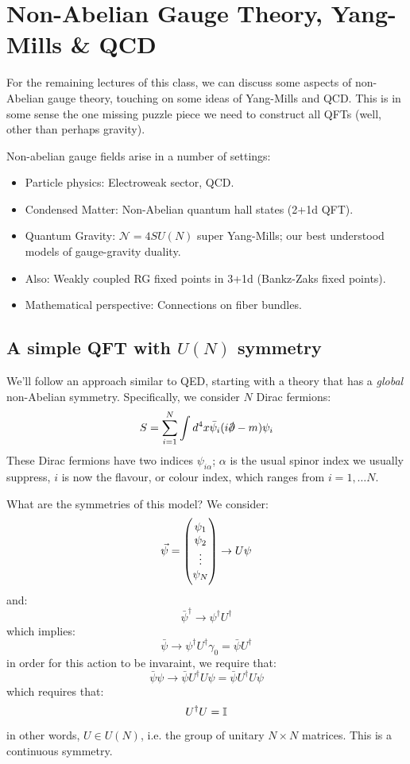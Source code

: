 \section{Non-Abelian Gauge Theory, Yang-Mills \& QCD}
For the remaining lectures of this class, we can discuss some aspects of non-Abelian gauge theory, touching on some ideas of Yang-Mills and QCD. This is in some sense the one missing puzzle piece we need to construct all QFTs (well, other than perhaps gravity).

Non-abelian gauge fields arise in a number of settings:
\begin{itemize}
    \item Particle physics: Electroweak sector, QCD.
    \item Condensed Matter: Non-Abelian quantum hall states (2+1d QFT).
    \item Quantum Gravity: $\mathcal{N}=4 SU(N)$ super Yang-Mills; our best understood models of gauge-gravity duality.
    \item Also: Weakly coupled RG fixed points in 3+1d (Bankz-Zaks fixed points).
    \item Mathematical perspective: Connections on fiber bundles.
\end{itemize}

\subsection{A simple QFT with $U(N)$ symmetry}

We'll follow an approach similar to QED, starting with a theory that has a \emph{global} non-Abelian symmetry. Specifically, we consider $N$ Dirac fermions:
\begin{equation}
    S = \sum_{i=1}^N \int d^4x \bar{\psi}_i(i\slashed{\p} - m)\psi_i
\end{equation}
These Dirac fermions have two indices $\psi_{i\alpha}$; $\alpha$ is the usual spinor index we usually suppress, $i$ is now the flavour, or colour index, which ranges from $i = 1, \ldots N$.

What are the symmetries of this model? We consider:
\begin{equation}
    \vec{\psi} = \begin{pmatrix}\psi_1 \\ \psi_2 \\ \vdots \\ \psi_N\end{pmatrix} \to U\psi
\end{equation}
and:
\begin{equation}
    \bar{\psi}^\dag \to \psi^\dag U^\dag
\end{equation}
which implies:
\begin{equation}
    \bar{\psi} \to \psi^\dag U^\dag \gamma_0 = \bar{\psi}U^\dag
\end{equation}
in order for this action to be invaraint, we require that:
\begin{equation}
    \bar{\psi}\psi \to \bar{\psi}U^\dag U \psi = \bar{\psi}U^\dag U \psi
\end{equation}
which requires that:
\begin{equation}
    U^\dagger U = \mathbb{I}
\end{equation}
in other words, $U \in U(N)$, i.e. the group of unitary $N \times N$ matrices. This is a continuous symmetry.

